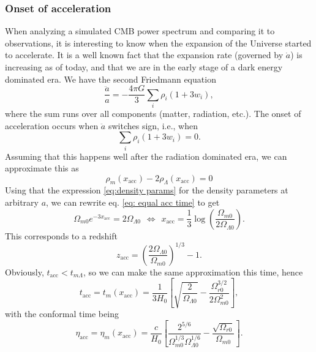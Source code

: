 \documentclass{aa}
\begin{document}
\subsubsection{Onset of acceleration}
When analyzing a simulated CMB power spectrum and comparing it to observations, it is interesting to know when the expansion of the Universe started to accelerate. It is a well known fact that the expansion rate (governed by $\dot{a}$) is increasing as of today, and that we are in the early stage of a dark energy dominated era. We have the second Friedmann equation
\begin{equation}
    \frac{\ddot{a}}{a} = -\frac{4\pi G}{3}\sum_i \rho_i\left(1 + 3w_i \right),
\end{equation}
where the sum runs over all components (matter, radiation, etc.). The onset of acceleration occurs when $\ddot{a}$ switches sign, i.e., when
\begin{equation}
    \sum_i \rho_i\left(1 + 3w_i \right) = 0.
\end{equation}
Assuming that this happens well after the radiation dominated era, we can approximate this as
\begin{equation}
  \rho_m(x_\text{acc})- 2\rho_\Lambda(x_\text{acc}) = 0 \label{eq: equal acc time}
\end{equation}
Using that the expression \eqref{eq:density params} for the density parameters at arbitrary $a$, we can rewrite eq. \eqref{eq: equal acc time} to get
\begin{equation}
  \Omega_{m0}e^{-3x_\text{acc}} = 2\Omega_{\Lambda0}
  \hspace{5pt}\Leftrightarrow\hspace{5pt}
  x_\text{acc} = \frac{1}{3}\log\left(\frac{\Omega_{m0}}{2\Omega_{\Lambda0}}\right).
\end{equation}
This corresponds to a redshift
\begin{equation}
  z_\text{acc} = \left(\frac{2\Omega_{\Lambda0}}{\Omega_{m0}}\right)^{1/3}-1.
\end{equation}
Obviously, $t_\text{acc}<t_{m\Lambda}$, so we can make the same approximation this time, hence
\begin{equation}
    t_\text{acc} = t_m(x_\text{acc}) = \frac{1}{3H_0}\left[\sqrt{\frac{2}{\Omega_{\Lambda0}}} -\frac{\Omega_{r0}^{3/2}}{2\Omega_{m0}^2}\right],
\end{equation}
with the conformal time being
\begin{equation}
    \eta_\text{acc} = \eta_m(x_\text{acc}) = \frac{c}{H_0}\left[\frac{2^{5/6}}{\Omega_{m0}^{1/3}\Omega_{\Lambda0}^{1/6}} - \frac{\sqrt{\Omega_{r0}}}{\Omega_{m0}}\right].
\end{equation}
\end{document}
